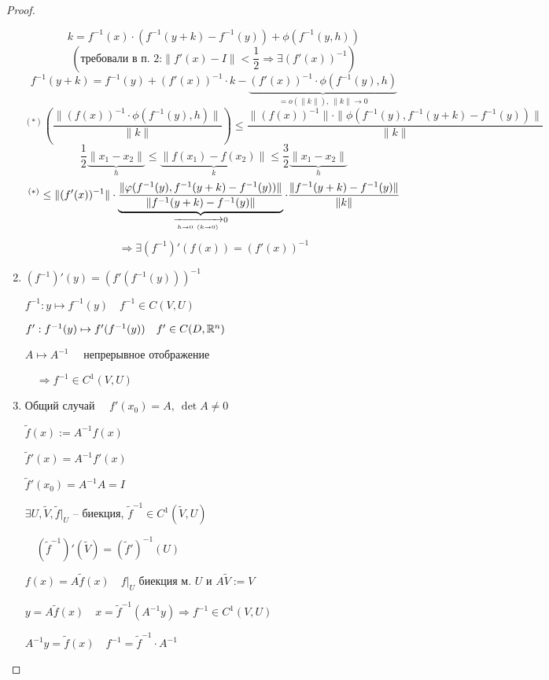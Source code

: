 \begin{proof}
\begin{enumerate}
\[                \]
                \[
                    k = f^{-1}(x) \cdot (f^{-1}(y + k) - f^{-1}(y)) + \phi(f^{-1}(y, h))    
                \]
                \[
                    \left(\text{требовали в п. } 2 \text{:} \|f'(x) - I\| < \frac12 \Rightarrow \exists (f'(x))^{-1}\right)    
                \]
                \[
                    f^{-1}(y + k) = f^{-1}(y) + (f'(x))^{-1} \cdot k - \underbrace{(f'(x))^{-1} \cdot \phi(f^{-1}(y), h)} _{= o(\|k\|), \ \|k\| \rightarrow 0}   
                \]
                \[
                    ^{(*)}\left(\frac{\|(f(x))^{-1} \cdot \phi(f^{-1}(y), h)\|}{\|k\|}\right) \le \frac{\|\left(f(x)\right)^{-1}\| \cdot \|\phi(f^{-1}(y), f^{-1}(y + k) - f^{-1}(y))\|}{\|k\|}    
                \]
                \[
                    \frac12\underbrace{\|x_1 - x_2\|}_{h} \le \underbrace{\|f(x_1) - f(x_2)\|}_{k} \le \frac32\underbrace{\|x_1 - x_2\|}_{h}   
                \]
                \[
                    ^{(*)} \le \|(f'(x))^{-1}\| \cdot \underbrace{\frac{\|\phi(f^{-1}(y), f^{-1}(y + k) - f^{-1}(y))\|}{\|f^{-1}(y + k) - f^{-1}(y)\|}}_{\xrightarrow[h \rightarrow 0 \newline (k \rightarrow 0)]{} 0} \cdot \frac{\|f^{-1}(y+k) - f^{-1}(y)\|}{\|k\|}
                \]
                \[
                    \Rightarrow \exists (f^{-1})'(f(x)) = (f'(x))^{-1}    
                \]
            \item $\left(f^{-1}\right)'(y) = \left(f'(f^{-1}(y))\right)^{-1}$
                \par $f^{-1} : y \mapsto f^{-1}(y) \quad f^{-1} \in C(V, U)$
                \par $f' : f^{-1}(y) \mapsto f'(f^{-1}(y)) \quad f' \in C(D, \mathbb{R}^n)$
                \par $A \mapsto A^{-1} \quad$ непрерывное отображение
                \par $\quad \Rightarrow f^{-1} \in C^1(V, U)$
            \item Общий случай $\quad f'(x_0) = A, \ \det A \not= 0$
                \par $\tilde f(x) := A^{-1}f(x)$
                \par $\tilde f'(x) = A^{-1}f'(x)$
                \par $\tilde f'(x_0) = A^{-1}A = I$
                \par $\exists U, \tilde V, \tilde f\big|_U$ -- биекция, $\tilde f^{-1} \in C^1(\tilde V, U)$
                \par $\quad (\tilde f^{-1})' (\tilde V) = (\tilde f')^{-1}(U)$
                \par $f(x) = A \tilde f(x) \quad f\big|_U$ биекция м. $U$ и $A \tilde V := V$
                \par $y = A \tilde f(x) \quad x = \tilde f^{-1}(A^{-1} y) \Rightarrow f^{-1} \in C^1(V, U)$
                \par $A^{-1}y = \tilde f(x) \quad f^{-1} = \tilde f^{-1} \cdot A^{-1}$
                

\end{enumerate}
\end{proof}
